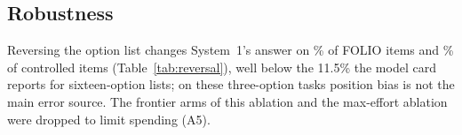 \subsection{Robustness}
\label{sec:robust}

Reversing the option list changes System~1's answer on \FlipFolioSone\% of FOLIO items and \FlipCtlSone\% of controlled items (Table~\ref{tab:reversal}), well below the 11.5\% the model card reports for sixteen-option lists; on these three-option tasks position bias is not the main error source.
The frontier arms of this ablation and the max-effort ablation were dropped to limit spending (A5).
